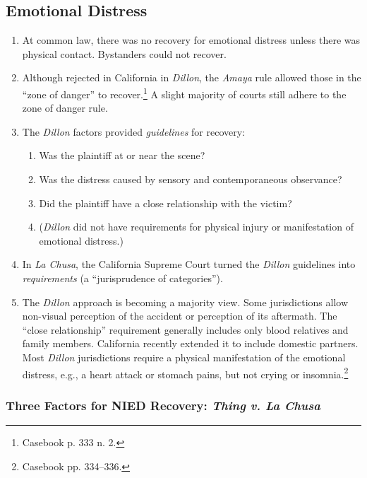 \subsection{Emotional Distress}

\begin{enumerate}
    \item At common law, there was no recovery for emotional distress unless 
    there was physical contact. Bystanders could not recover.
    \item Although rejected in California in \emph{Dillon}, the \emph{Amaya} 
    rule allowed those in the ``zone of danger'' to recover.\footnote{Casebook 
    p. 333 n. 2.} A slight majority of courts still adhere to the zone of  
    danger rule.
    \item The \emph{Dillon} factors provided \emph{guidelines} for recovery:
    \begin{enumerate}
        \item Was the plaintiff at or near the scene?
        \item Was the distress caused by sensory and contemporaneous 
        observance?
        \item Did the plaintiff have a close relationship with the victim?
        \item (\emph{Dillon} did not have requirements for physical injury or 
        manifestation of emotional distress.)
    \end{enumerate}
    \item In \emph{La Chusa}, the California Supreme Court turned the 
    \emph{Dillon} guidelines into \emph{requirements} (a ``jurisprudence of 
    categories'').
    \item The \emph{Dillon} approach is becoming a majority view. Some 
    jurisdictions allow non-visual perception of the accident or perception of 
    its aftermath. The ``close relationship'' requirement generally includes 
    only blood relatives and family members. California recently extended it 
    to include domestic partners. Most \emph{Dillon} jurisdictions require a 
    physical manifestation of the emotional distress, e.g., a heart attack or 
    stomach pains, but not crying or insomnia.\footnote{Casebook pp.  
    334--336.}
\end{enumerate}

\subsubsection{Three Factors for NIED Recovery: \emph{Thing v. La Chusa}}

